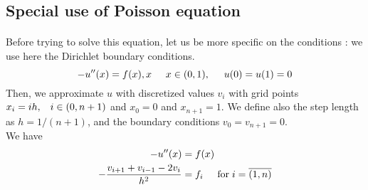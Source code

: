 \documentclass[a4paper, twoside, 11pt]{report}
\theoremstyle{theorem}
\theoremstyle{remark}
\theoremstyle{exemple}
\begin{document}
		\subsection{Special use of Poisson equation}
		\paragraph{} Before trying to solve this equation, let us be more specific on the conditions : we use here the Dirichlet boundary conditions.
		\begin{equation*} 
		-u''(x) = f(x), x \hspace{0.5cm} x\in(0,1), \hspace{0.5cm} u(0) = u(1) = 0
		\end{equation*}
		Then, we approximate $u$ with discretized values $v_{i}$ with grid points $x_{i} = ih , \hspace{0.3cm} i\in(0,n+1) $ and $x_{0} = 0$ and $x_{n+1} = 1$. We define also the step length as $h=1/(n+1)$, and the boundary conditions $v_{0} = v_{n+1} = 0$.
		\\We have
		\begin{align}
		-u''(x) &= f(x)
		\\-\frac{v_{i+1} + v_{i-1} - 2v_{i}}{h^2} &= f_{i} \hspace{0.5cm} \mathrm{for} \hspace{0.1cm} i = \overline {(1,n)}
		\end{align}
		
\end{document}
